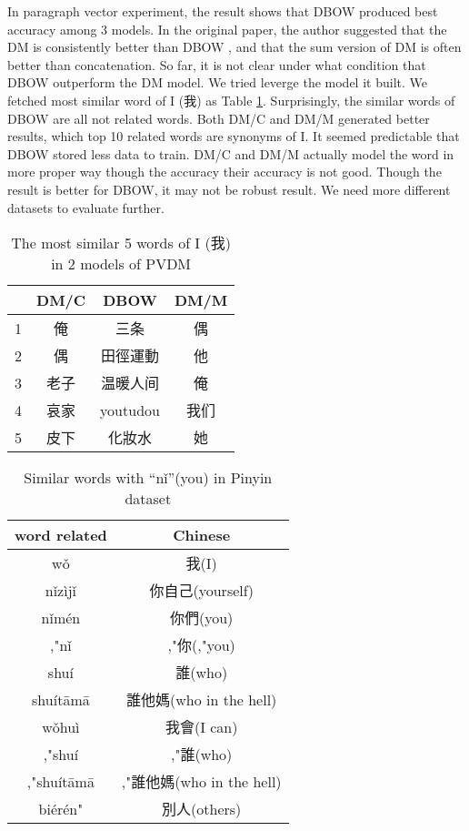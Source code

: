 In paragraph vector experiment, the result shows that DBOW produced best accuracy among 3 models. In the original paper, the author suggested that the DM is consistently better than DBOW
, and that the sum version of DM is often better than concatenation. 
So far, it is not clear under what condition that DBOW outperform the DM model. We tried leverge the model it built. 
We fetched most similar word of I (我) as Table \ref{table:doc2vec}. Surprisingly, the similar words of DBOW are all not related words. 
Both DM/C and DM/M generated better results, which top 10 related words are synonyms of I.
It seemed predictable that DBOW stored less data to train. DM/C and DM/M actually model the word in more proper way though the accuracy their accuracy is not good.
Though the result is better for DBOW, it may not be robust result. We need more different datasets to evaluate further.
\begin{CJK}{UTF8}{gbsn}
\begin{table}[]
\centering
\caption{The most similar 5 words of I (我) in 2 models of PVDM}
\label{table:doc2vec}
\begin{tabular}{|c|c|c|c|}
\hline
      & DM/C & DBOW & DM/M \\
\hline
1 & 俺 &  三条  & 偶\\
2 & 偶  & 田徑運動 & 他\\
3 & 老子  & 温暖人间 & 俺\\
4 & 哀家  & youtudou & 我们\\
5 & 皮下  & 化妝水 & 她 \\
\hline
\end{tabular}
\end{table}
\end{CJK}

\begin{table}[]
\centering
\caption{Similar words with \enquote{nǐ}(you) in Pinyin dataset}
\label{table:py_similar}
\begin{tabular}{|c|c|}
\hline
 word related  & Chinese  \\
\hline
wǒ         &   我(I)  \\
nǐzìjǐ     &   你自己(yourself) \\   
nǐmén      &   你們(you)   \\
,"nǐ       &   ,"你(,"you)  \\ 
shuí       &   誰(who)   \\
shuítāmā   &   誰他媽(who in the hell)\\   
wǒhuì      &   我會(I can)   \\
,"shuí     &   ,"誰(who)   \\
,"shuítāmā &   ,"誰他媽(who in the hell)\\   
biérén"    &   別人(others)\\
\hline
\end{tabular}
\end{table}


